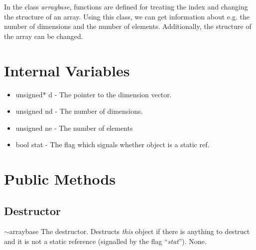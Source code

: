 %

\noindent
In the class {\em arraybase}, functions are defined for treating the
index and changing the structure of an array. Using this class, we can
get information about e.g. the number of dimensions and the number of
elements. Additionally, the structure of the array can be changed.

\vspace*{10mm}

\section{Internal Variables}

\begin{itemize}
\item unsigned* d - The pointer to the dimension vector.
\item unsigned nd - The number of dimensions.
\item unsigned ne - The number of elements
\item bool stat - The flag which signals whether object is a static ref.
\end{itemize}


\clearpage

\section{Public Methods}

\subsection{Destructor}

\setNormalInstance
\printEmptyMethodReturn
{}
{$\sim$arraybase}
{The destructor. Destructs {\em this} object if there is anything to
destruct and it is not a static reference (signalled by the flag
``{\em stat}'').}
{None.}
\setCorrectWidthThree{4pt}

